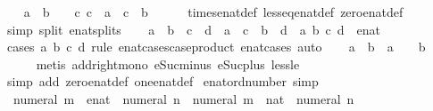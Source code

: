 \begin{isabellebody}
\ \ \isamarkupfalse%
\ {\isachardoublequoteopen}a\ {\isasymle}\ b\ {\isasymLongrightarrow}\ {}\ {\isasymle}\ c\ {\isasymLongrightarrow}c\ {\isacharasterisk}\ a\ {\isasymle}\ c\ {\isacharasterisk}\ b{\isachardoublequoteclose}\isanewline
\ \ \ \ \isamarkupfalse%
\ times{\isacharunderscore}enat{\isacharunderscore}def\ less{\isacharunderscore}eq{\isacharunderscore}enat{\isacharunderscore}def\ zero{\isacharunderscore}enat{\isacharunderscore}def\isanewline
\ \ \ \ \isamarkupfalse%
\ {\isacharparenleft}simp\ split{\isacharcolon}\ enat{\isachardot}splits{\isacharparenright}\isanewline
\ \ \isamarkupfalse%
\ {\isachardoublequoteopen}a\ {\isacharless}\ b\ {\isasymLongrightarrow}\ c\ {\isacharless}\ d\ {\isasymLongrightarrow}\ a\ {\isacharplus}\ c\ {\isacharless}\ b\ {\isacharplus}\ d{\isachardoublequoteclose}\ \ a\ b\ c\ d\ {\isacharcolon}{\isacharcolon}\ enat\isanewline
\ \ \ \ \isamarkupfalse%
\ {\isacharparenleft}cases\ a\ b\ c\ d\ rule{\isacharcolon}\ enat{}{\isacharunderscore}cases{\isacharbrackleft}case{\isacharunderscore}product\ enat{}{\isacharunderscore}cases{\isacharbrackright}{\isacharparenright}\ auto\isanewline
\ \ \isamarkupfalse%
\ {\isachardoublequoteopen}a\ {\isacharless}\ b\ {\isasymLongrightarrow}\ a\ {\isacharplus}\ {}\ {\isacharless}\ b\ {\isacharplus}\ {}{\isachardoublequoteclose}\isanewline
\ \ \ \ \isamarkupfalse%
\ {\isacharparenleft}metis\ add{\isacharunderscore}right{\isacharunderscore}mono\ eSuc{\isacharunderscore}minus{\isacharunderscore}{}\ eSuc{\isacharunderscore}plus{\isacharunderscore}{}\ less{\isacharunderscore}le{\isacharparenright}\isanewline
{}\isamarkupfalse%
\ {\isacharparenleft}simp\ add{\isacharcolon}\ zero{\isacharunderscore}enat{\isacharunderscore}def\ one{\isacharunderscore}enat{\isacharunderscore}def{\isacharparenright}%
\endisatagproof
{\isafoldproof}%
%
\isadelimproof
\isanewline
%
\endisadelimproof
\isanewline
\isanewline
\isanewline
{}\isamarkupfalse%
\ enat{\isacharunderscore}ord{\isacharunderscore}number\ {\isacharbrackleft}simp{\isacharbrackright}{\isacharcolon}\isanewline
\ \ {\isachardoublequoteopen}{\isacharparenleft}numeral\ m\ {\isacharcolon}{\isacharcolon}\ enat{\isacharparenright}\ {\isasymle}\ numeral\ n\ {\isasymlongleftrightarrow}\ {\isacharparenleft}numeral\ m\ {\isacharcolon}{\isacharcolon}\ nat{\isacharparenright}\ {\isasymle}\ numeral\ n{\isachardoublequoteclose}\isanewline

\end{isabellebody}
